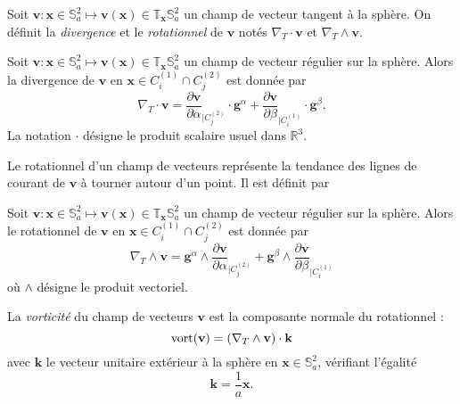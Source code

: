 Soit $\mathbf{v} : \mathbf{x} \in \mathbb{S}_a^2 \mapsto \mathbf{v}(\mathbf{x}) \in \mathbb{T}_{\mathbf{x}} \mathbb{S}_a^2$ un champ de vecteur tangent à la sphère. On définit la \textit{divergence} et le \textit{rotationnel} de $\mathbf{v}$ notés $\nabla_T \cdot \mathbf{v}$ et $\nabla_T \wedge \mathbf{v}$.

\begin{definition}
Soit $\mathbf{v} : \mathbf{x} \in \mathbb{S}_a^2 \mapsto \mathbf{v}(\mathbf{x}) \in \mathbb{T}_{\mathbf{x}} \mathbb{S}_a^2$ un champ de vecteur régulier sur la sphère. Alors la divergence de $\mathbf{v}$ en $\mathbf{x} \in C_i^{(1)} \cap C_j^{(2)}$ est donnée par
\begin{equation}
\nabla_T \cdot \mathbf{v} = \dfrac{\partial \mathbf{v}}{\partial \alpha}_{|C^{(2)}_j} \cdot \mathbf{g}^{\alpha} + \dfrac{\partial \mathbf{v}}{\partial \beta}_{|C^{(1)}_i} \cdot \mathbf{g}^{\beta}.
\end{equation}
\label{def:divergence}
La notation $\cdot$ désigne le produit scalaire usuel dans $\mathbb{R}^3$.
\end{definition}
Le rotationnel d'un champ de vecteurs représente la tendance des lignes de courant de $\mathbf{v}$ à tourner autour d'un point. Il est définit par

\begin{definition}
Soit $\mathbf{v} : \mathbf{x} \in \mathbb{S}_a^2 \mapsto \mathbf{v}(\mathbf{x}) \in \mathbb{T}_{\mathbf{x}} \mathbb{S}_a^2$ un champ de vecteur régulier sur la sphère. Alors le rotationnel de $\mathbf{v}$ en $\mathbf{x} \in C_i^{(1)} \cap C_j^{(2)}$ est donnée par
\begin{equation}
\nabla_T \wedge \mathbf{v} =  \mathbf{g}^{\alpha} \wedge \dfrac{\partial \mathbf{v}}{\partial \alpha}_{|C^{(2)}_j} + \mathbf{g}^{\beta} \wedge \dfrac{\partial \mathbf{v}}{\partial \beta}_{|C^{(1)}_i}
\end{equation}
où $\wedge$ désigne le produit vectoriel.
\label{def:rotationnel}
\end{definition}
La \textit{vorticité} du champ de vecteurs $\mathbf{v}$ est la composante normale du rotationnel :
\begin{equation}
\text{vort} ( \mathbf{v} ) = \left( \nabla_T \wedge \mathbf{v} \right) \cdot \mathbf{k}
\label{eq:vorticité}
\end{equation}
avec $\mathbf{k}$ le vecteur unitaire extérieur à la sphère en $\mathbf{x} \in \mathbb{S}_a^2$, vérifiant l'égalité
\begin{equation}
\mathbf{k} = \dfrac{1}{a} \mathbf{x}.
\end{equation}

